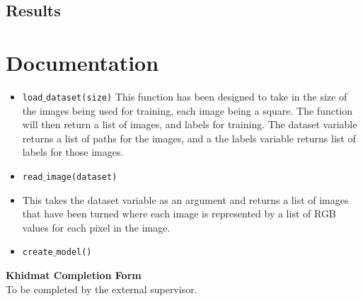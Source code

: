 \documentclass{article}
\begin{document}
  \subsection{Results}
 \begin{center}
      \begin{figure}[h!]
    \centering
    \qquad
    \label{fig:example}%
\end{figure}
\end{center}
\newpage
\appendix
\section{Documentation}
\begin{itemize}
  \item \texttt{load$\_$dataset(size)}
  This function has been designed to take in the size of the images being used for training, each image being a square. The function will then return a list of images, and labels for training. The dataset variable returns a list of paths for the images, and a the labels variable returns list of labels for those images.
  \item \texttt{read$\_$image(dataset)}
  \item This takes the dataset variable as an argument and returns a list of images that have been turned where each image is represented by a list of RGB values for each pixel in the image.
  \item \texttt{create$\_$model()}
\end{itemize}
\newpage
\begin{center}
  {\Large\bf Khidmat Completion Form}\\[5pt]
  \small To be completed by the external supervisor.  
\end{center}
\bigskip
\end{document}
